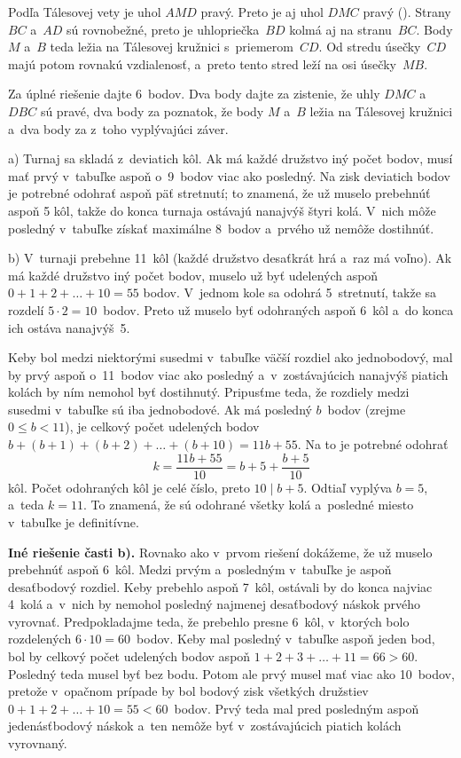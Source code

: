 {%
Podľa Tálesovej vety je uhol $AMD$ pravý. Preto je aj uhol $DMC$ pravý (\obr). Strany $BC$ a~$AD$ sú rovnobežné, preto je uhlopriečka~$BD$ kolmá aj na stranu~$BC$. Body $M$ a~$B$ teda ležia na Tálesovej kružnici s~priemerom~$CD$. Od stredu úsečky~$CD$ majú potom rovnakú vzdialenosť, a~preto tento stred leží na osi úsečky~$MB$.

\nobreak\medskip\petit\noindent
Za úplné riešenie dajte 6~bodov. Dva body dajte za zistenie, že uhly $DMC$ a~$DBC$ sú pravé, dva body za poznatok, že body $M$ a~$B$ ležia na Tálesovej kružnici a~dva body za z~toho vyplývajúci záver.
\endpetit
\bigbreak}

{%
a) Turnaj sa skladá z~deviatich kôl. Ak má každé družstvo iný počet bodov, musí mať prvý v~tabuľke aspoň o~9~bodov viac ako posledný. Na zisk deviatich bodov je potrebné odohrať aspoň päť stretnutí; to znamená, že už muselo prebehnúť aspoň 5 kôl, takže do konca turnaja ostávajú nanajvýš štyri kolá. V~nich môže posledný v~tabuľke získať maximálne 8~bodov a~prvého už nemôže dostihnúť.

\smallskip
b) V~turnaji prebehne 11~kôl (každé družstvo desaťkrát hrá a~raz má voľno). Ak má každé družstvo iný počet bodov, muselo už byť udelených aspoň $0+1+2+\dots+10=55$ bodov. V~jednom kole sa odohrá 5~stretnutí, takže sa rozdelí $5\cdot2=10$~bodov. Preto už muselo byť odohraných aspoň 6~kôl a~do konca ich ostáva nanajvýš~5.

Keby bol medzi niektorými susedmi v~tabuľke väčší rozdiel ako jednobodový, mal by prvý aspoň o~11~bodov viac ako posledný a~v~zostávajúcich nanajvýš piatich kolách by ním nemohol byť dostihnutý. Pripusťme teda, že rozdiely medzi susedmi v~tabuľke sú iba jednobodové. Ak má posledný $b$~bodov (zrejme $0\le b<11$), je celkový počet udelených bodov $b+(b+1)+(b+2)+\dots+(b+10)=11b+55$. Na to je potrebné odohrať
$$
k=\frac{11b+55}{10}=b+5+\frac{b+5}{10}
$$
kôl. Počet odohraných kôl je celé číslo, preto $10\mid b+5$. Odtiaľ vyplýva $b=5$, a~teda $k=11$. To znamená, že sú odohrané všetky kolá a~posledné miesto v~tabuľke je definitívne.

\medskip
{\bf Iné riešenie časti b).}
Rovnako ako v~prvom riešení dokážeme, že už muselo prebehnúť aspoň 6~kôl. Medzi prvým a~posledným v~tabuľke je aspoň desaťbodový rozdiel. Keby prebehlo aspoň 7~kôl, ostávali by do konca najviac 4~kolá a~v~nich by nemohol posledný najmenej desaťbodový náskok prvého vyrovnať. Predpokladajme teda, že prebehlo presne 6~kôl, v~ktorých bolo rozdelených $6\cdot10=60$~bodov. Keby mal posledný v~tabuľke aspoň jeden bod, bol by celkový počet udelených bodov aspoň $1+2+3+\dots+11=66>60$. Posledný teda musel byť bez bodu. Potom ale prvý musel mať viac ako 10~bodov, pretože v~opačnom prípade by bol bodový zisk všetkých družstiev $0+1+2+\dots+10=55<60$~bodov. Prvý teda mal pred posledným aspoň jedenásťbodový náskok a~ten nemôže byť v~zostávajúcich piatich kolách vyrovnaný.

}
